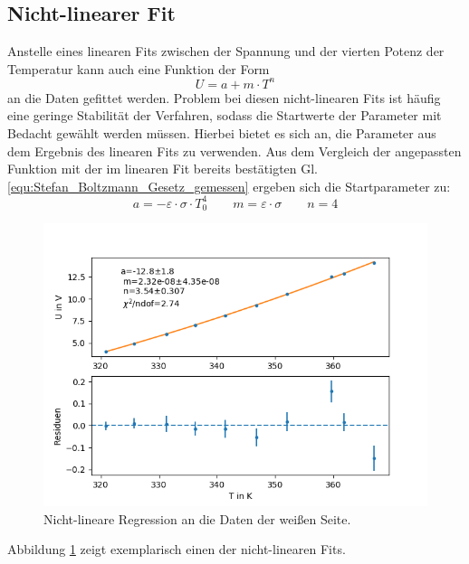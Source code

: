 \documentclass[12pt,a4paper]{article}
\begin{document}
\subsection{Nicht-linearer Fit}
Anstelle eines linearen Fits zwischen der Spannung und der vierten Potenz der Temperatur kann auch eine Funktion der Form
\begin{equation*}
U = a + m \cdot T^n
\end{equation*}
an die Daten gefittet werden. Problem bei diesen nicht-linearen Fits ist häufig eine geringe Stabilität der Verfahren, sodass die Startwerte der Parameter mit Bedacht gewählt werden müssen. Hierbei bietet es sich an, die Parameter aus dem Ergebnis des linearen Fits zu verwenden. Aus dem Vergleich der angepassten Funktion mit der im linearen Fit bereits bestätigten Gl. \ref{equ:Stefan_Boltzmann_Gesetz_gemessen} ergeben sich die Startparameter zu:
\begin{equation*}
a = - \varepsilon \cdot \sigma \cdot T_0^4 \qquad m = \varepsilon \cdot \sigma \qquad n = 4
\end{equation*}

\begin{figure}
\centering
\includegraphics[scale=0.8]{Bilder/nichtlinear_A_weiss}
\caption{Nicht-lineare Regression an die Daten der weißen Seite.}
\label{fig:nicht_linearRegweiss_A}
\end{figure}

Abbildung \ref{fig:nicht_linearRegweiss_A} zeigt exemplarisch einen der nicht-linearen Fits.
\end{document}
